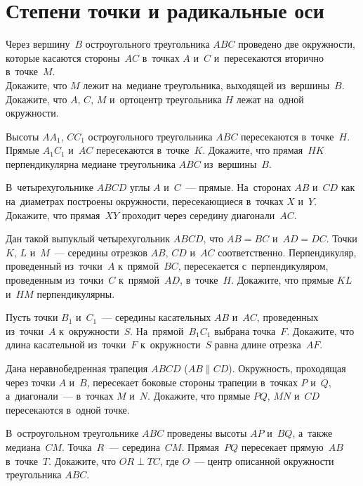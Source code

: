 
\section*{Степени точки и радикальные оси}


\begin{problems}

\item
Через вершину~$B$ остроугольного треугольника $ABC$ проведено две окружности,
которые касаются стороны~$AC$ в~точках $A$ и~$C$ и~пересекаются вторично
в~точке~$M$.
\\
\subproblem
Докажите, что $M$ лежит на~медиане треугольника, выходящей из~вершины~$B$.
\\
\subproblem
Докажите, что $A$, $C$, $M$ и~ортоцентр треугольника $H$ лежат на~одной
окружности.

\item
Высоты $A A_1$, $C C_1$ остроугольного треугольника $ABC$ пересекаются
в~точке~$H$.
Прямые $A_1 C_1$ и~$AC$ пересекаются в~точке~$K$.
Докажите, что прямая~$HK$ перпендикулярна медиане треугольника $ABC$
из~вершины~$B$.

\item
В~четырехугольнике $ABCD$ углы $A$ и~$C$~--- прямые.
На~сторонах $AB$ и~$CD$ как на~диаметрах построены окружности, пересекающиеся
в~точках $X$ и~$Y$.
Докажите, что прямая~$XY$ проходит через середину диагонали~$AC$.

\item
Дан такой выпуклый четырехугольник $ABCD$, что $AB = BC$ и~$AD = DC$.
Точки $K$, $L$ и~$M$~--- середины отрезков $AB$, $CD$ и~$AC$ соответственно.
Перпендикуляр, проведенный из~точки~$A$ к~прямой~$BC$, пересекается
с~перпендикуляром, проведенным из~точки~$C$ к~прямой~$AD$, в~точке~$H$.
Докажите, что прямые $KL$ и~$HM$ перпендикулярны.

\item
Пусть точки $B_1$ и~$C_1$~--- середины касательных $AB$ и~$AC$, проведенных
из~точки~$A$ к~окружности~$S$.
На~прямой~$B_1 C_1$ выбрана точка~$F$.
Докажите, что длина касательной из~точки~$F$ к~окружности~$S$ равна длине
отрезка~$AF$.

\item
Дана неравнобедренная трапеция $ABCD$ ($AB \parallel CD$).
Окружность, проходящая через точки $A$ и~$B$, пересекает боковые стороны
трапеции в~точках $P$ и~$Q$, а~диагонали~--- в~точках $M$ и~$N$.
Докажите, что прямые $PQ$, $MN$ и~$CD$ пересекаются в~одной точке.

\item
В~остроугольном треугольнике $ABC$ проведены высоты $AP$ и~$BQ$, а~также
медиана~$CM$.
Точка~$R$~--- середина~$CM$.
Прямая~$PQ$ пересекает прямую~$AB$ в~точке~$T$.
Докажите, что $OR \perp TC$, где $O$~--- центр описанной окружности
треугольника $ABC$.

\end{problems}

